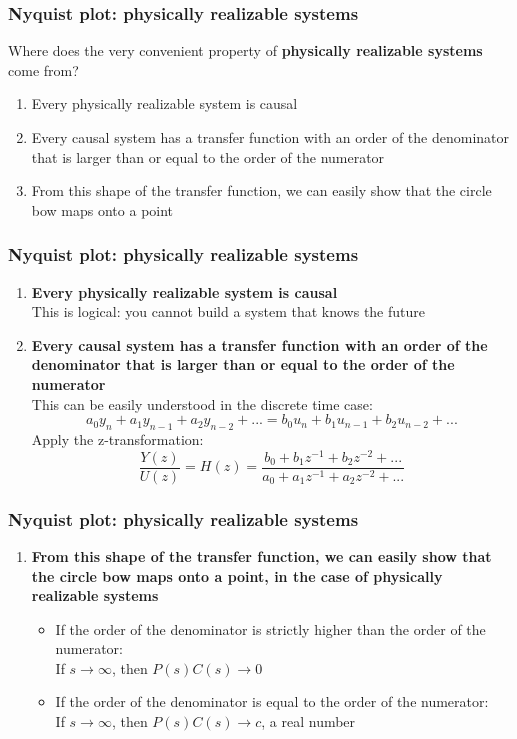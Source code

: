 \begin{frame}
	\frametitle{Nyquist plot: physically realizable systems}
	\vspace{-8ex}
	Where does the very convenient property of \textbf{physically realizable systems} come from?
	\begin{enumerate}
		\item Every physically realizable system is causal
		\item Every causal system has a transfer function with an order of the denominator that is larger than or equal to the order of the numerator
		\item From this shape of the transfer function, we can easily show that the circle bow maps onto a point
	\end{enumerate}
\end{frame}

\newcommand{\asuivre}{\setcounter{sauvegardeenumi}{\theenumi}}
\newcommand{\suite}{\setcounter{enumi}{\thesauvegardeenumi}}

\begin{frame}
	\frametitle{Nyquist plot: physically realizable systems}
	\begin{enumerate}
		\item \textbf{Every physically realizable system is causal}\\
		This is logical: you cannot build a system that knows the future
		\item \textbf{Every causal system has a transfer function with an order of the denominator that is larger than or equal to the order of the numerator}\\
		This can be easily understood in the discrete time case:
		$$a_0y_n + a_1y_{n-1}+a_2y_{n-2}+...=b_0u_n+b_1u_{n-1}+b_2u_{n-2}+...$$
		Apply the z-transformation:
		$$\frac{Y(z)}{U(z)}=H(z)=\frac{b_0+b_1z^{-1}+b_2z^{-2}+...}{a_0+a_1z^{-1}+a_2z^{-2}+...}$$
		\asuivre
	\end{enumerate}
\end{frame}

\begin{frame}
	\frametitle{Nyquist plot: physically realizable systems}
	\vspace{-8ex}
	\begin{enumerate}
		\suite
		\item \textbf{From this shape of the transfer function, we can easily show that the circle bow maps onto a point, in the case of physically realizable systems}\\
		\begin{itemize}
			\item If the order of the denominator is strictly higher than the order of the numerator:\\
			If $s\rightarrow \infty$, then $P(s)C(s)\rightarrow 0$
			\item If the order of the denominator is equal to the order of the numerator:\\
			If $s\rightarrow \infty$, then $P(s)C(s)\rightarrow c$, a real number
		\end{itemize}
	\end{enumerate}
\end{frame}


